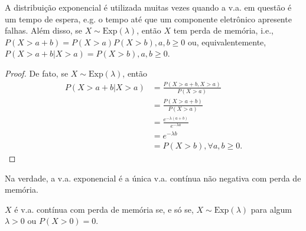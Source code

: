 \documentclass[../Notas.tex]{subfiles}
\begin{document}
\begin{remark}
A distribuição exponencial é utilizada muitas vezes quando a v.a. em questão é um tempo de espera, e.g. o tempo até que um componente eletrônico apresente falhas. Além disso, se $X\sim\text{Exp}(\lambda)$, então $X$ tem perda de memória, i.e., $P(X > a+b) = P(X>a)P(X>b), a,b\geq 0$ ou, equivalentemente, $P(X>a+b| X>a) = P(X>b), a,b\geq 0$.
\begin{proof}
De fato, se $X\sim\text{Exp}(\lambda)$, então
\begin{align*}
    P(X>a+b|X>a) &= \frac{P(X>a+b, X>a)}{P(X>a)} \\
    &= \frac{P(X>a+b)}{P(X>a)} \\
    &= \frac{ e^{-\lambda (a+b)} }{ e^{-\lambda a} } \\
    &= e^{-\lambda b} \\
    &= P(X>b), \forall a,b\geq 0.
\end{align*}
\end{proof}
Na verdade, a v.a. exponencial é a única v.a. contínua não negativa com perda de memória.
\end{remark}

\begin{theorem}
$X$ é v.a. contínua com perda de memória se, e só se, $X\sim\text{Exp}(\lambda)$ para algum $\lambda > 0$ ou $P(X>0) = 0$.
\end{theorem}
\end{document}
